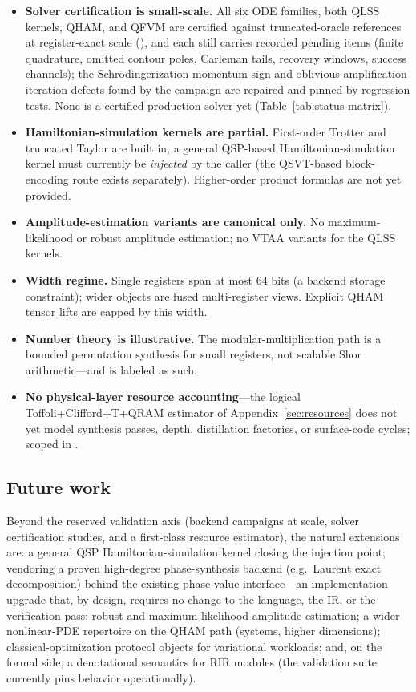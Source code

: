 \begin{itemize}
\item \textbf{Solver certification is small-scale.}  All six ODE families,
  both QLSS kernels, QHAM, and QFVM are certified against truncated-oracle
  references at register-exact scale (), and each
  still carries recorded pending items (finite quadrature, omitted contour
  poles, Carleman tails, recovery windows, success channels); the
  Schr\"odingerization momentum-sign and oblivious-amplification iteration
  defects found by the campaign are repaired and pinned by regression
  tests.  None is
  a certified production solver yet (Table~\ref{tab:status-matrix}).
\item \textbf{Hamiltonian-simulation kernels are partial.}  First-order
  Trotter and truncated Taylor are built in; a general QSP-based
  Hamiltonian-simulation kernel must currently be \emph{injected} by the
  caller (the QSVT-based block-encoding route exists separately).
  Higher-order product formulas are not yet provided.
\item \textbf{Amplitude-estimation variants are canonical only.}  No
  maximum-likelihood or robust amplitude estimation; no VTAA variants for
  the QLSS kernels.
\item \textbf{Width regime.}  Single registers span at most 64 bits (a
  backend storage constraint); wider objects are fused multi-register
  views.  Explicit QHAM tensor lifts are capped by this width.
\item \textbf{Number theory is illustrative.}  The modular-multiplication
  path is a bounded permutation synthesis for small registers, not scalable
  Shor arithmetic---and is labeled as such.
\item \textbf{No physical-layer resource accounting}---the logical
  Toffoli+Clifford+T+QRAM estimator of Appendix~\ref{sec:resources} does not yet
  model synthesis passes, depth, distillation factories, or surface-code
  cycles; scoped in .
\end{itemize}

\subsection{Future work}
\label{sec:future}

Beyond the reserved validation axis (backend campaigns at scale, solver
certification studies, and a first-class resource estimator), the natural
extensions are: a general QSP Hamiltonian-simulation kernel closing the
injection point; vendoring a proven high-degree phase-synthesis backend
(e.g.\ Laurent exact decomposition) behind the existing phase-value
interface---an implementation upgrade that, by design, requires no change
to the language, the IR, or the verification pass; robust and
maximum-likelihood amplitude estimation; a
wider nonlinear-PDE repertoire on the QHAM path (systems, higher
dimensions); classical-optimization protocol objects for variational
workloads; and, on the formal side, a denotational semantics for RIR
modules (the validation suite currently pins behavior operationally).

